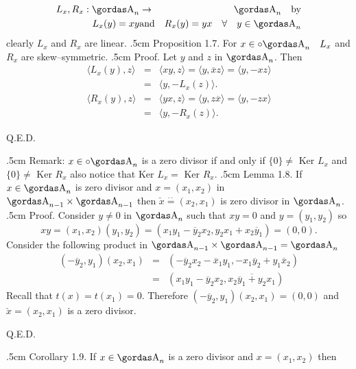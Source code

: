 \begin{eqnarray*}
L_{x},R_{x}:\a_{n}&\rightarrow &\a_{n}\quad\hbox{by}\\
L_{x}(y)=xy&\hbox{\bs and}&R_{x}(y)=yx\quad\forall\quad y\in \a_{n}
\end{eqnarray*}
clearly $L_{x}$ and $R_{x}$ are linear.
\vglue.5cm
\noindent
{\bsbf Proposition 1.7.} For $x\in \circ{\a}_{n}\quad L_{x}$ and $R_{x}$ 
are skew--symmetric.
\vglue.5cm
\noindent
{\bsbf Proof.} Let $y$ and $z$ in $\a_{n}$. Then
\begin{eqnarray*}
\langle L_{x}(y), z\rangle&=&\langle xy,z\rangle=\langle y,\overline{x}z\rangle=
\langle y,-xz\rangle\\
&=&\langle y,-L_{x}(z)\rangle.\\
\langle R_{x}(y),z\rangle&=&\langle yx,z\rangle =\langle y,z\overline{x}\rangle=
\langle y,-zx\rangle\\
&=&\langle y,-R_{x}(z)\rangle.
\end{eqnarray*}
\begin{flushright}
Q.E.D.
\end{flushright}
\vglue.5cm
\noindent
{\bsbf Remark:} $x\in \circ{\a}_{n}$ is  a zero divisor if and only if
$\{0\}\neq $ Ker $L_{x}$ and \\
$\{0\}\neq$ Ker $R_{x}$ also notice that 
Ker $L_{x}=$ Ker $R_{x}$.
\vglue.5cm
\noindent
{\bsbf Lemma 1.8.} If $x\in \a_{n}$ is zero divisor and $x=(x_{1},x_{2})$ in
$\a_{n-1}\times \a_{n-1}$ then 
$
\check{x}\stackrel{\cdot\cdot}{=}(x_{2},x_{1})$ is zero divisor in 
$\a_{n}$. 
\vglue.5cm
\noindent
{\bsbf Proof.} Consider $y\neq 0$ in $\a_{n}$ such that $xy=0$ and 
$y=(y_{1},y_{2})$ so
$$xy=(x_{1},x_{2})(y_{1},y_{2})=(x_{1}y_{1}-\overline{y}_{2}x_{2},y_{2}x_{1}+x_{2}
\overline{y}_{1})=(0,0).$$
Consider the  following product in $\a_{n-1}\times \a_{n-1}=\a_{n}$%
\begin{eqnarray*}
(-\overline{y}_{2},y_{1})(x_{2},x_{1})&=&(-\overline{y}_{2}x_{2}-\overline{x}_{1}y_{1},
-x_{1}\overline{y}_{2}+y_{1}\overline{x}_{2})\\
&=&(x_{1}y_{1}-\overline{y}_{2}x_{2},\overline{x_{2}\overline{y}_{1}+y_{2}x_{1}})
\end{eqnarray*}
Recall that $t(x)=t(x_{1})=0$. Therefore $(-\overline{y}_{2},y_{1})(x_{2},x_{1})=(0,0)$
and \\
$\check{x}=(x_{2},x_{1})$ is a zero divisor.
\begin{flushright}
Q.E.D.
\end{flushright}
\vglue.5cm
\noindent
{\bsbf Corollary 1.9.} If $x\in \a_{n}$ is a zero divisor and $x=(x_{1},x_{2})$ then\\

